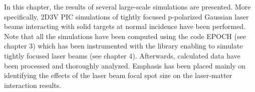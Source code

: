 In this chapter, the results of several large-scale simulations are presented. More specifically, 2D3V PIC simulations of tightly focused p-polarized Gaussian laser beams interacting with solid targets at normal incidence have been performed. Note that all the simulations have been computed using the code EPOCH (see chapter 3) which has been instrumented with the library enabling to simulate tightly focused laser beams (see chapter 4). Afterwards, calculated data have been processed and thoroughly analyzed. Emphasis has been placed mainly on identifying the effects of the laser beam focal spot size on the laser-matter interaction results.